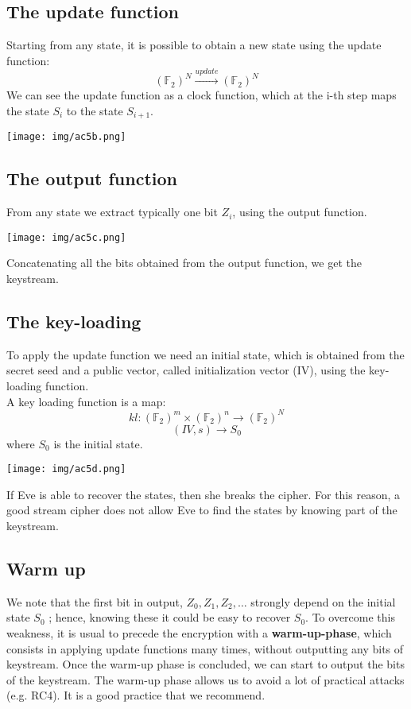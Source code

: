 \documentclass[a4paper, 10pt, titlepage]{article}
\begin{document}
\subsection*{The update function}
Starting from any state, it is possible to obtain a new state using the update function:
$$(\mathbb{F}_2)^N \overset{update} \longrightarrow (\mathbb{F}_2)^N$$
We can see the update function as a clock function, which at the i-th step maps the state $S_i$ to the state $S_{i+1}$.
\begin{center}
\texttt{[image: img/ac5b.png]}
\end{center}

\subsection*{The output function}
From any state we extract typically one bit $Z_i$, using the output function.
\begin{center}
\texttt{[image: img/ac5c.png]}
\end{center}
Concatenating all the bits obtained from the output function, we get the keystream.

\subsection*{The key-loading}
To apply the update function we need an initial state, which is obtained from the secret seed and a public vector, called initialization vector (IV), using the key-loading function. \medskip \\
A key loading function is a map:
$$kl : (\mathbb{F}_2)^m \times (\mathbb{F}_2)^n \longrightarrow (\mathbb{F}_2)^N$$
$$(IV, s) \rightarrow S_0$$
where $S_0$ is the initial state. \medskip 
\begin{center}
\texttt{[image: img/ac5d.png]}
\end{center}
If Eve is able to recover the states, then she breaks the cipher. For this reason, a good stream cipher does not allow Eve to find the states by knowing part of the keystream.

\subsection{Warm up}
We note that the first bit in output, $Z_0, Z_1, Z_2, \dots$ strongly depend on the initial state $S_0$ ; hence, knowing these it could be easy to recover $S_0$. To overcome this weakness, it is usual to precede the encryption with a \textbf{warm-up-phase}, which consists in applying update functions many times, without outputting any bits of keystream. Once the warm-up phase is concluded, we can start to output the bits of the keystream.
The warm-up phase allows us to avoid a lot of practical attacks (e.g. RC4). It is a good practice that we recommend.
\end{document}

